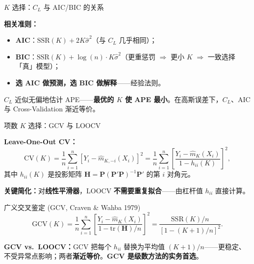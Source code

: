 \documentclass[aspectratio=169, 10pt]{beamer}
\begin{document}
\begin{frame}{$K$ 选择：$C_L$ 与 AIC/BIC 的关系}

  \begin{keybox}
    \textbf{相关准则：}
    \begin{itemize}
      \item \textbf{AIC}：$\text{SSR}(K) + 2K\hat\sigma^2$（与 $C_L$ 几乎相同）；
      \item \textbf{BIC}：$\text{SSR}(K) + \log(n)\cdot K\hat\sigma^2$（更重惩罚 $\Rightarrow$ 更小 $K$ $\Rightarrow$ 一致选择「真」模型）；
      \item \textbf{选 AIC 做预测，选 BIC 做解释}——经验法则。
    \end{itemize}
  \end{keybox}

  \begin{highlightbox}
    $C_L$ 近似无偏地估计 APE——\textbf{最优的 $K$ 使 APE 最小}。在高斯误差下，$C_L$、AIC 与 Cross-Validation 渐近等价。
  \end{highlightbox}

\end{frame}


\begin{frame}{项数 $K$ 选择：GCV 与 LOOCV}

  \textbf{Leave-One-Out CV：}
  \[
    \text{CV}(K) = \frac{1}{n}\sum_{i=1}^n [Y_i - \hat m_{K,-i}(X_i)]^2
    = \frac{1}{n}\sum_{i=1}^n \left[\frac{Y_i - \hat m_K(X_i)}{1 - h_{ii}(K)}\right]^2,
  \]
  其中 $h_{ii}(K)$ 是投影矩阵 $\mathbf{H} = \mathbf{P}(\mathbf{P}'\mathbf{P})^{-1}\mathbf{P}'$ 的第 $i$ 对角元。

  \begin{highlightbox}
    \textbf{关键简化：}对\textbf{线性平滑器}，LOOCV \textbf{不需要重复拟合}——由杠杆值 $h_{ii}$ 直接计算。
  \end{highlightbox}


  \begin{definitionbox}{{广义交叉鉴定 (GCV, Craven \& Wahba 1979)}}
    \[
      \text{GCV}(K) = \frac{1}{n}\sum_{i=1}^n \left[\frac{Y_i - \hat m_K(X_i)}{1 - \text{tr}(\mathbf{H})/n}\right]^2
      = \frac{\text{SSR}(K)/n}{[1 - (K+1)/n]^2}.
    \]
  \end{definitionbox}

  \begin{keybox}
    \textbf{GCV vs.\ LOOCV：}GCV 把每个 $h_{ii}$ 替换为平均值 $(K+1)/n$——更稳定、不受异常点影响；两者\textbf{渐近等价}。\textbf{GCV 是级数方法的实务首选}。
  \end{keybox}

\end{frame}
\end{document}
